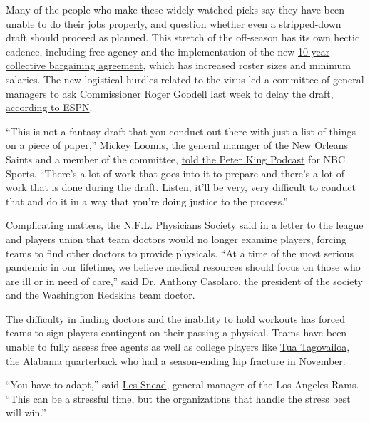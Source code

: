Many of the people who make these widely watched picks say they have
been unable to do their jobs properly, and question whether even a
stripped-down draft should proceed as planned. This stretch of the
off-season has its own hectic cadence, including free agency and the
implementation of the new
\href{https://www.nytimes3xbfgragh.onion/2020/03/15/sports/football/nfl-cba-approved.html}{10-year
collective bargaining agreement}, which has increased roster sizes and
minimum salaries. The new logistical hurdles related to the virus led a
committee of general managers to ask Commissioner Roger Goodell last
week to delay the draft,
\href{https://www.espn.com/nfl/story/_/id/28950223/nfl-wants-april-draft-go-scheduled-gms-recommendation}{according
to ESPN}.

``This is not a fantasy draft that you conduct out there with just a
list of things on a piece of paper,'' Mickey Loomis, the general manager
of the New Orleans Saints and a member of the committee,
\href{https://podcasts.apple.com/us/podcast/saints-gm-mickey-loomis-plus-jeff-darlington-on-tom/id1150960126?i=1000469442119}{told
the Peter King Podcast} for NBC Sports. ``There's a lot of work that
goes into it to prepare and there's a lot of work that is done during
the draft. Listen, it'll be very, very difficult to conduct that and do
it in a way that you're doing justice to the process.''

Complicating matters, the
\href{http://www.nfl.com/news/story/0ap3000001107372/article/nflrelated-physicals-discontinued-due-to-covid19}{N.F.L.
Physicians Society said in a letter} to the league and players union
that team doctors would no longer examine players, forcing teams to find
other doctors to provide physicals. ``At a time of the most serious
pandemic in our lifetime, we believe medical resources should focus on
those who are ill or in need of care,'' said Dr. Anthony Casolaro, the
president of the society and the Washington Redskins team doctor.

The difficulty in finding doctors and the inability to hold workouts has
forced teams to sign players contingent on their passing a physical.
Teams have been unable to fully assess free agents as well as college
players like
\href{https://www.nytimes3xbfgragh.onion/2019/11/16/sports/ncaafootball/tua-tagovailoa-carted-off-injury-mississippi-state.html}{Tua
Tagovailoa}, the Alabama quarterback who had a season-ending hip
fracture in November.

``You have to adapt,'' said
\href{https://www.pro-football-reference.com/executives/SneaLe0.htm}{Les
Snead}, general manager of the Los Angeles Rams. ``This can be a
stressful time, but the organizations that handle the stress best will
win.''

